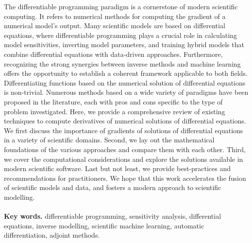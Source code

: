 {\footnotesize
The differentiable programming paradigm is a cornerstone of modern scientific computing. 
It refers to numerical methods for computing the gradient of a numerical model's output. 
Many scientific models are based on differential equations, where differentiable programming plays a crucial role in calculating model sensitivities, inverting model parameters, and training hybrid models that combine differential equations with data-driven approaches.
Furthermore, recognizing the strong synergies between inverse methods and machine learning offers the opportunity to establish a coherent framework applicable to both fields.
Differentiating functions based on the numerical solution of differential equations is non-trivial. 
Numerous methods based on a wide variety of paradigms have been proposed in the literature, each with pros and cons specific to the type of problem investigated.
Here, we provide a comprehensive review of existing techniques to compute derivatives of numerical solutions of differential equations.
We first discuss the importance of gradients of solutions of differential equations in a variety of scientific domains.
Second, we lay out the mathematical foundations of the various approaches and compare them with each other. 
Third, we cover the computational considerations and explore the solutions available in modern scientific software.
Last but not least, we provide best-practices and recommendations for practitioners. 
We hope that this work accelerates the fusion of scientific models and data, and fosters a modern approach to scientific modelling.
\\ \\
\noindent \textbf{Key words.} differentiable programming, sensitivity analysis, differential equations, inverse modelling, scientific machine learning, automatic differentiation, adjoint methods.
}
